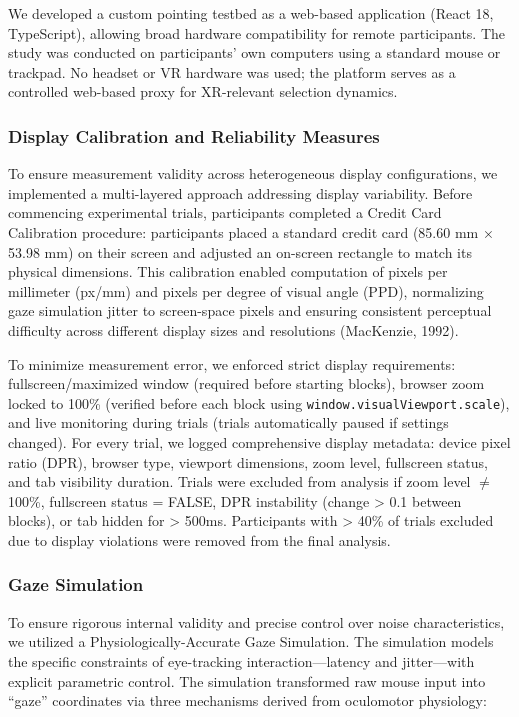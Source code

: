 \documentclass[
  11pt,
  11pt,
  letterpaper]{article}
\begin{document}
We developed a custom pointing testbed as a web-based application (React
18, TypeScript), allowing broad hardware compatibility for remote
participants. The study was conducted on participants' own computers
using a standard mouse or trackpad. No headset or VR hardware was used;
the platform serves as a controlled web-based proxy for XR-relevant
selection dynamics.

\subsubsection{Display Calibration and Reliability
Measures}\label{display-calibration-and-reliability-measures}

To ensure measurement validity across heterogeneous display
configurations, we implemented a multi-layered approach addressing
display variability. Before commencing experimental trials, participants
completed a Credit Card Calibration procedure: participants placed a
standard credit card (85.60 mm × 53.98 mm) on their screen and adjusted
an on-screen rectangle to match its physical dimensions. This
calibration enabled computation of pixels per millimeter (px/mm) and
pixels per degree of visual angle (PPD), normalizing gaze simulation
jitter to screen-space pixels and ensuring consistent perceptual
difficulty across different display sizes and resolutions (MacKenzie,
1992).

To minimize measurement error, we enforced strict display requirements:
fullscreen/maximized window (required before starting blocks), browser
zoom locked to 100\% (verified before each block using
\texttt{window.visualViewport.scale}), and live monitoring during trials
(trials automatically paused if settings changed). For every trial, we
logged comprehensive display metadata: device pixel ratio (DPR), browser
type, viewport dimensions, zoom level, fullscreen status, and tab
visibility duration. Trials were excluded from analysis if zoom level
\(\neq\) 100\%, fullscreen status = FALSE, DPR instability (change
\textgreater{} 0.1 between blocks), or tab hidden for \textgreater{}
500ms. Participants with \textgreater{} 40\% of trials excluded due to
display violations were removed from the final analysis.

\subsubsection{Gaze Simulation}\label{gaze-simulation}

To ensure rigorous internal validity and precise control over noise
characteristics, we utilized a Physiologically-Accurate Gaze Simulation.
The simulation models the specific constraints of eye-tracking
interaction---latency and jitter---with explicit parametric control. The
simulation transformed raw mouse input into ``gaze'' coordinates via
three mechanisms derived from oculomotor physiology:
\end{document}
